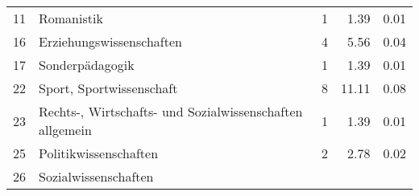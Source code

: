 \begin{longtable}{lXrrr}
     11 &
     \multicolumn{1}{X}{ Romanistik   } &


       \num{1} &
       \num[round-mode=places,round-precision=2]{1,39} &
         \num[round-mode=places,round-precision=2]{0,01} \\

     16 &
     \multicolumn{1}{X}{ Erziehungswissenschaften   } &


       \num{4} &
       \num[round-mode=places,round-precision=2]{5,56} &
         \num[round-mode=places,round-precision=2]{0,04} \\

     17 &
     \multicolumn{1}{X}{ Sonderpädagogik   } &


       \num{1} &
       \num[round-mode=places,round-precision=2]{1,39} &
         \num[round-mode=places,round-precision=2]{0,01} \\

     22 &
     \multicolumn{1}{X}{ Sport, Sportwissenschaft   } &


       \num{8} &
       \num[round-mode=places,round-precision=2]{11,11} &
         \num[round-mode=places,round-precision=2]{0,08} \\

     23 &
     \multicolumn{1}{X}{ Rechts-, Wirtschafts- und Sozialwissenschaften allgemein   } &


       \num{1} &
       \num[round-mode=places,round-precision=2]{1,39} &
         \num[round-mode=places,round-precision=2]{0,01} \\

     25 &
     \multicolumn{1}{X}{ Politikwissenschaften   } &


       \num{2} &
       \num[round-mode=places,round-precision=2]{2,78} &
         \num[round-mode=places,round-precision=2]{0,02} \\

     26 &
     \multicolumn{1}{X}{ Sozialwissenschaften   } &



\end{longtable}
